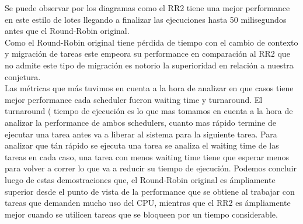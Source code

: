  Se puede observar por los diagramas como el RR2 tiene una mejor performance en este estilo
 de lotes llegando a finalizar las ejecuciones hasta 50 milisegundos antes que el Round-Robin
 original.\\
 Como el Round-Robin original tiene pérdida de tiempo con el cambio de contexto y
 migración de tareas este empeora su performance en comparación al RR2 que no admite
 este tipo de migración es notorio la superioridad en relación a nuestra conjetura.\\
 
 Las m\'{e}tricas que m\'{a}s tuvimos en cuenta a la hora de analizar en que casos tiene mejor performance 
 cada scheduler fueron waiting time y turnaround. El turnaround ( tiempo de ejecuci\'{o}n es lo 
 que mas tomamos en cuenta a la hora de analizar la performance de ambos schedulers, cuanto mas r\'{a}pido 
 termine de ejecutar una tarea antes va a liberar al sistema para la siguiente tarea. Para analizar que t\'{a}n 
 r\'{a}pido se ejecuta una tarea se analiza el waiting time de las tareas en cada caso, una tarea con menos waiting 
 time tiene que esperar menos para volver a correr lo que va a reducir su tiempo de ejecuci\'{o}n.
 Podemos concluir luego de estas demostraciones que, el Round-Robin original es \'{a}mpliamente
 superior desde el punto de vista de la performance que se obtiene al trabajar con tareas
 que demanden mucho uso del CPU, mientras que el RR2 es \'{a}mpliamente mejor cuando se utilicen
 tareas que se bloqueen por un tiempo considerable.\\
 
 

